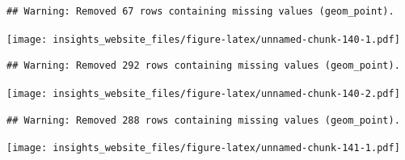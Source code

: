 \documentclass[]{book}
\newenvironment{Shaded}{\begin{snugshade}}{\end{snugshade}}
\newcommand{\DataTypeTok}[1]{\textcolor[rgb]{0.13,0.29,0.53}{#1}}
\newcommand{\FloatTok}[1]{\textcolor[rgb]{0.00,0.00,0.81}{#1}}
\newcommand{\KeywordTok}[1]{\textcolor[rgb]{0.13,0.29,0.53}{\textbf{#1}}}
\newcommand{\NormalTok}[1]{#1}
\newcommand{\OperatorTok}[1]{\textcolor[rgb]{0.81,0.36,0.00}{\textbf{#1}}}
\newcommand{\StringTok}[1]{\textcolor[rgb]{0.31,0.60,0.02}{#1}}
\begin{document}
\begin{verbatim}
## Warning: Removed 67 rows containing missing values (geom_point).
\end{verbatim}

\texttt{[image: insights\_website\_files/figure-latex/unnamed-chunk-140-1.pdf]}

\begin{Shaded}
\end{Shaded}

\begin{verbatim}
## Warning: Removed 292 rows containing missing values (geom_point).
\end{verbatim}

\texttt{[image: insights\_website\_files/figure-latex/unnamed-chunk-140-2.pdf]}

\begin{Shaded}
\end{Shaded}

\begin{verbatim}
## Warning: Removed 288 rows containing missing values (geom_point).
\end{verbatim}

\texttt{[image: insights\_website\_files/figure-latex/unnamed-chunk-141-1.pdf]}
\end{document}
